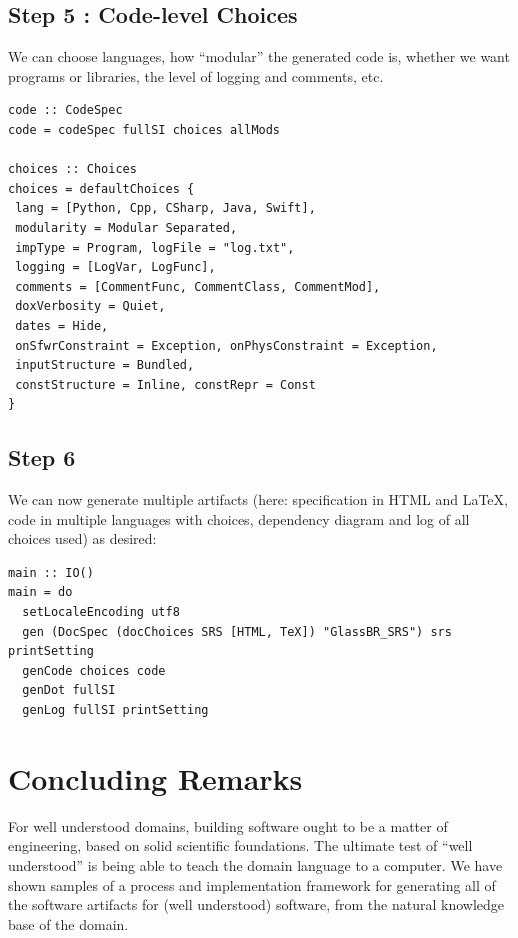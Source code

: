 \documentclass[sigconf,review,anonymous=false]{acmart}
\begin{document}
\subsection*{Step 5 : Code-level Choices}

We can choose languages, how ``modular'' the generated code is, whether we
want programs or libraries, the level of logging and comments, etc.

\begin{lstlisting}
code :: CodeSpec
code = codeSpec fullSI choices allMods

choices :: Choices
choices = defaultChoices {
 lang = [Python, Cpp, CSharp, Java, Swift], 
 modularity = Modular Separated,
 impType = Program, logFile = "log.txt", 
 logging = [LogVar, LogFunc],
 comments = [CommentFunc, CommentClass, CommentMod], 
 doxVerbosity = Quiet,
 dates = Hide, 
 onSfwrConstraint = Exception, onPhysConstraint = Exception,
 inputStructure = Bundled, 
 constStructure = Inline, constRepr = Const
}
\end{lstlisting}

\subsection*{Step 6}

We can now generate multiple artifacts (here: specification in HTML and \LaTeX,
code in multiple languages with choices, dependency diagram and log of all
choices used) as desired:

\begin{lstlisting}
main :: IO()
main = do
  setLocaleEncoding utf8
  gen (DocSpec (docChoices SRS [HTML, TeX]) "GlassBR_SRS") srs printSetting
  genCode choices code
  genDot fullSI
  genLog fullSI printSetting
\end{lstlisting}

\section{Concluding Remarks} \label{ch:concluding_remarks}

For well understood domains, building software ought to be a matter of
engineering, based on solid scientific foundations. The ultimate test of ``well
understood'' is being able to teach the domain language to a computer. We have
shown samples of a process and implementation framework for generating all of
the software artifacts for (well understood) software, from the natural
knowledge base of the domain.
\end{document}
